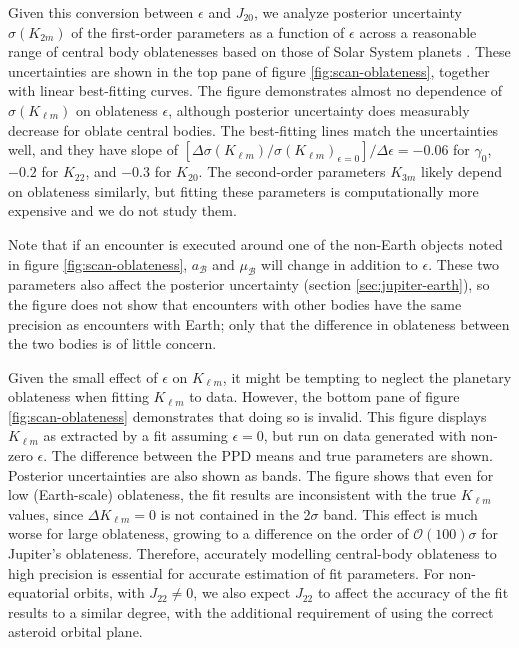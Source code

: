 \documentclass[fleqn,usenatbib]{mnras}
\begin{document}
Given this conversion between $\epsilon$ and $J_{20}$, we analyze posterior uncertainty $\sigma(K_{2 m})$ of the first-order parameters as a function of $\epsilon$ across a reasonable range of central body oblatenesses based on those of Solar System planets \cite{paterLissauer2015}. These uncertainties are shown in the top pane of figure \ref{fig:scan-oblateness}, together with linear best-fitting curves. The figure demonstrates almost no dependence of $\sigma(K_{\ell m})$ on oblateness $\epsilon$, although posterior uncertainty does measurably decrease for oblate central bodies. The best-fitting lines match the uncertainties well, and they have slope of $[\Delta \sigma(K_{\ell m}) / \sigma(K_{\ell m})_{\epsilon=0}] / \Delta \epsilon = -0.06$ for $\gamma_0$, $-0.2$ for $K_{22}$, and $-0.3$ for $K_{20}$. The second-order parameters $K_{3m}$ likely depend on oblateness similarly, but fitting these parameters is computationally more expensive and we do not study them.

Note that if an encounter is executed around one of the non-Earth objects noted in figure \ref{fig:scan-oblateness}, $a_\mathcal{B}$ and $\mu_\mathcal{B}$ will change in addition to $\epsilon$. These two parameters also affect the posterior uncertainty (section \ref{sec:jupiter-earth}), so the figure does not show that encounters with other bodies have the same precision as encounters with Earth; only that the difference in oblateness between the two bodies is of little concern.

Given the small effect of $\epsilon$ on $K_{\ell m}$, it might be tempting to neglect the planetary oblateness when fitting $K_{\ell m}$ to data. However, the bottom pane of figure \ref{fig:scan-oblateness} demonstrates that doing so is invalid. This figure displays $K_{\ell m}$ as extracted by a fit assuming $\epsilon = 0$, but run on data generated with non-zero $\epsilon$. The difference between the PPD means and true parameters are shown. Posterior uncertainties are also shown as bands. The figure shows that even for low (Earth-scale) oblateness, the fit results are inconsistent with the true $K_{\ell m}$ values, since $\Delta K_{\ell m} = 0$ is not contained in the 2$\sigma$ band. This effect is much worse for large oblateness, growing to a difference on the order of $\mathcal{O}(100)\sigma$ for Jupiter's oblateness. Therefore, accurately modelling central-body oblateness to high precision is essential for accurate estimation of fit parameters. For non-equatorial orbits, with $J_{22} \neq 0$, we also expect $J_{22}$ to affect the accuracy of the fit results to a similar degree, with the additional requirement of using the correct asteroid orbital plane.
\end{document}
